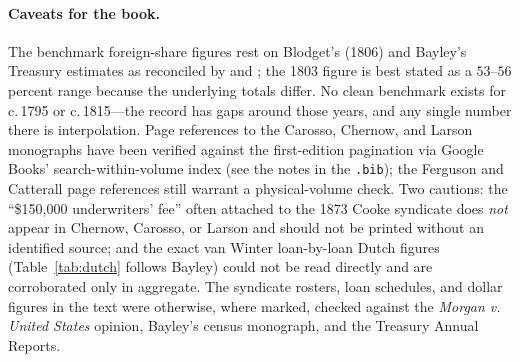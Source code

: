 \documentclass[12pt]{article}
\begin{document}
\paragraph{Caveats for the book.} The benchmark foreign-share figures rest on
Blodget's (1806) and Bayley's Treasury estimates as reconciled by
\citet{syllawilsonwright2006} and \citet{wilkins1989history}; the 1803 figure is
best stated as a $53$--$56$ percent range because the underlying totals differ.
No clean benchmark exists for c.\,1795 or c.\,1815---the record has gaps around
those years, and any single number there is interpolation. Page references to the
Carosso, Chernow, and Larson monographs have been verified against the
first-edition pagination via Google Books' search-within-volume index (see the
notes in the \texttt{.bib}); the Ferguson and Catterall page references still
warrant a physical-volume check. Two cautions: the ``\$150{,}000 underwriters'
fee'' often attached to the 1873 Cooke syndicate does \emph{not} appear in
Chernow, Carosso, or Larson and should not be printed without an identified
source; and the exact van Winter loan-by-loan Dutch figures (Table~\ref{tab:dutch}
follows Bayley) could not be read directly and are corroborated only in
aggregate. The syndicate rosters, loan schedules, and dollar figures in the text
were otherwise, where marked, checked against the \emph{Morgan v. United States}
opinion, Bayley's census monograph, and the Treasury Annual Reports.



\end{document}
